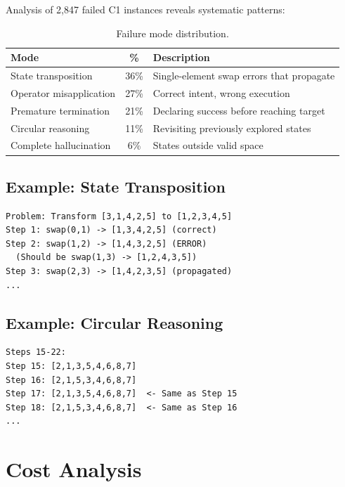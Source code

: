 \documentclass{article}
\theoremstyle{plain}
\theoremstyle{definition}
\theoremstyle{remark}
\begin{document}
Analysis of 2,847 failed C1 instances reveals systematic patterns:

\begin{table}[h]
\centering
\caption{Failure mode distribution.}
\label{tab:failures}
\small
\begin{tabular}{@{}lcp{8cm}@{}}
\toprule
\textbf{Mode} & \textbf{\%} & \textbf{Description} \\
\midrule
State transposition & 36\% & Single-element swap errors that propagate \\
Operator misapplication & 27\% & Correct intent, wrong execution \\
Premature termination & 21\% & Declaring success before reaching target \\
Circular reasoning & 11\% & Revisiting previously explored states \\
Complete hallucination & 6\% & States outside valid space \\
\bottomrule
\end{tabular}
\end{table}

\subsection{Example: State Transposition}

\begin{verbatim}
Problem: Transform [3,1,4,2,5] to [1,2,3,4,5]
Step 1: swap(0,1) -> [1,3,4,2,5] (correct)
Step 2: swap(1,2) -> [1,4,3,2,5] (ERROR)
  (Should be swap(1,3) -> [1,2,4,3,5])
Step 3: swap(2,3) -> [1,4,2,3,5] (propagated)
...
\end{verbatim}

\subsection{Example: Circular Reasoning}

\begin{verbatim}
Steps 15-22:
Step 15: [2,1,3,5,4,6,8,7]
Step 16: [2,1,5,3,4,6,8,7] 
Step 17: [2,1,3,5,4,6,8,7]  <- Same as Step 15
Step 18: [2,1,5,3,4,6,8,7]  <- Same as Step 16
...
\end{verbatim}


\section{Cost Analysis}
\label{app:cost}
\end{document}
